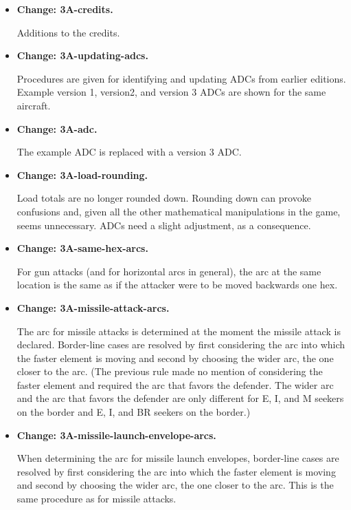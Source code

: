 \documentclass{report}
\newcommand{\changetag}[1]{\textbf{Change: #1.}\par}
\begin{document}
\begin{itemize}

    \item\changetag{3A-credits}

        Additions to the credits.

    \item\changetag{3A-updating-adcs}

        Procedures are given for identifying and updating ADCs from earlier editions. Example version 1, version2, and version 3 ADCs are shown for the same aircraft.

    \item\changetag{3A-adc}

        The example ADC is replaced with a version 3 ADC.

    \item\changetag{3A-load-rounding}

        Load totals are no longer rounded down. Rounding down can provoke confusions and, given all the other mathematical manipulations in the game, seems unnecessary. ADCs need a slight adjustment, as a consequence.

    \item\changetag{3A-same-hex-arcs}

        For gun attacks (and for horizontal arcs in general), the arc at the same location is the same as if the attacker were to be moved backwards one hex.

    \item\changetag{3A-missile-attack-arcs}

        The arc for missile attacks is determined at the moment the missile attack is declared. Border-line cases are resolved by first considering the arc into which the faster element is moving and second by choosing the wider arc, the one closer to the  arc. (The previous rule made no mention of considering the faster element and required the arc that favors the defender. The wider arc and the arc that favors the defender are only different for E, I, and M seekers on the  border and E, I, and BR seekers on the  border.)

    \item\changetag{3A-missile-launch-envelope-arcs}

        When determining the arc for missile launch envelopes, border-line cases are resolved by first considering the arc into which the faster element is moving and second by choosing the wider arc, the one closer to the  arc. This is the same procedure as for missile attacks.


\end{itemize}
\end{document}
